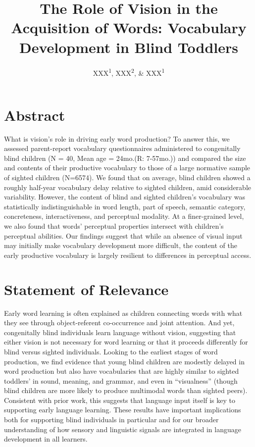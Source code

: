 \documentclass[english,man,floatsintext]{apa6}
\title{The Role of Vision in the Acquisition of Words: Vocabulary Development in Blind Toddlers}
\author{XXX\textsuperscript{1}, XXX\textsuperscript{2}, \& XXX\textsuperscript{1}}
\date{}
\affiliation{\vspace{0.5cm}\textsuperscript{1} XXX\\\textsuperscript{2} XXX}
\begin{document}
\maketitle

\hypertarget{abstract}{%
\section{Abstract}\label{abstract}}

What is vision's role in driving early word production? To answer this, we assessed parent-report vocabulary questionnaires administered to congenitally blind children (N = 40, Mean age = 24mo.(R: 7-57mo.)) and compared the size and contents of their productive vocabulary to those of a large normative sample of sighted children (N=6574). We found that on average, blind children showed a roughly half-year vocabulary delay relative to sighted children, amid considerable variability. However, the content of blind and sighted children's vocabulary was statistically indistinguishable in word length, part of speech, semantic category, concreteness, interactiveness, and perceptual modality. At a finer-grained level, we also found that words' perceptual properties intersect with children's perceptual abilities. Our findings suggest that while an absence of visual input may initially make vocabulary development more difficult, the content of the early productive vocabulary is largely resilient to differences in perceptual access.

\hypertarget{statement-of-relevance}{%
\section{Statement of Relevance}\label{statement-of-relevance}}

Early word learning is often explained as children connecting words with what they see through object-referent co-occurrence and joint attention. And yet, congenitally blind individuals learn language without vision, suggesting that either vision is not necessary for word learning or that it proceeds differently for blind versus sighted individuals. Looking to the earliest stages of word production, we find evidence that young blind children are modestly delayed in word production but also have vocabularies that are highly similar to sighted toddlers' in sound, meaning, and grammar, and even in \enquote{visualness} (though blind children are more likely to produce multimodal words than sighted peers). Consistent with prior work, this suggests that language input itself is key to supporting early language learning. These results have important implications both for supporting blind individuals in particular and for our broader understanding of how sensory and linguistic signals are integrated in language development in all learners.
\end{document}
